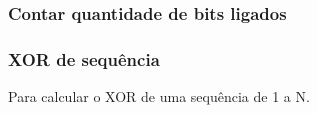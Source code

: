 \subsubsection{Contar quantidade de bits ligados}

\subsubsection{XOR de sequ\^{e}ncia}
Para calcular o XOR de uma sequ\^{e}ncia de 1 a N.
\divisor
